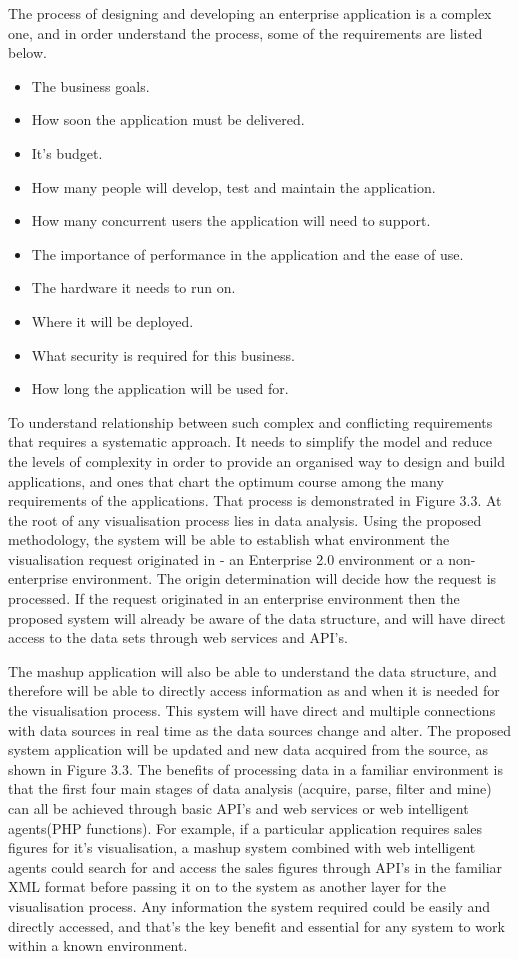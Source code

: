 The process of designing and developing an enterprise application is a complex one, and in order understand the process, some of the requirements are listed below.

\begin{itemize}
\item 	The business goals.
\item	How soon the application must be delivered.
\item	It's budget.
\item	How many people will develop, test and maintain the application.
\item	How many concurrent users the application will need to support.
\item	The importance of performance in the application and the ease of use.
\item	The hardware it needs to run on.
\item	Where it will be deployed.
\item	What security is required for this business.
\item	How long the application will be used for.
\end{itemize}

To understand relationship between such complex and conflicting requirements that requires a systematic approach. It needs to simplify the model and reduce the levels of complexity in order to provide an organised way to design and build applications, and ones that chart the optimum course among the many requirements of the applications. That process is demonstrated in Figure 3.3. At the root of any visualisation process lies in data analysis. Using the proposed methodology, the system will be able to establish what environment the visualisation request originated in - an Enterprise 2.0 environment or a non-enterprise environment. The origin determination will decide how the request is processed. If the request originated in an enterprise environment then the proposed system will already be aware of the data structure, and will have direct access to the data sets through web services and API's. 

The mashup application will also be able to understand the data structure, and therefore will be able to directly access information as and when it is needed for the visualisation process. This system will have direct and multiple connections with data sources in real time as the data sources change and alter. The proposed system application will be updated and new data acquired from the source, as shown in Figure 3.3. The benefits of processing data in a familiar environment is that the first four main stages of data analysis (acquire, parse, filter and mine) can all be achieved through basic API's and web services or web intelligent agents(PHP functions). For example, if a particular application requires sales figures for it's visualisation, a mashup system combined with web intelligent agents could search for and access the sales figures through API's in the familiar XML format before passing it on to the system as another layer for the visualisation process. Any information the system required could be easily and directly accessed, and that's the key benefit and essential for any system to work within a known environment.

